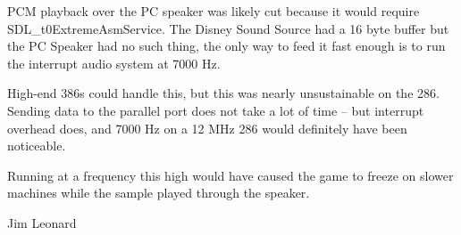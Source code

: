  \begin{fancyquotes}
 PCM playback over the PC speaker was likely cut because it would require SDL\_t0ExtremeAsmService. The Disney Sound Source had a 16 byte buffer but the PC Speaker had no such thing, the only way to feed it fast enough is to run the interrupt audio system at 7000 Hz.\\
 \par
  High-end 386s could handle this, but this was nearly unsustainable on the 286. Sending data to the parallel port does not take a lot of time -- but interrupt overhead does, and 7000 Hz on a 12 MHz 286 would definitely have been noticeable.\\
 \par
 Running at a frequency this high would have caused the game to freeze on slower machines while the sample played through the speaker.\\
\par
 Jim Leonard
\end{fancyquotes}\\
\par









